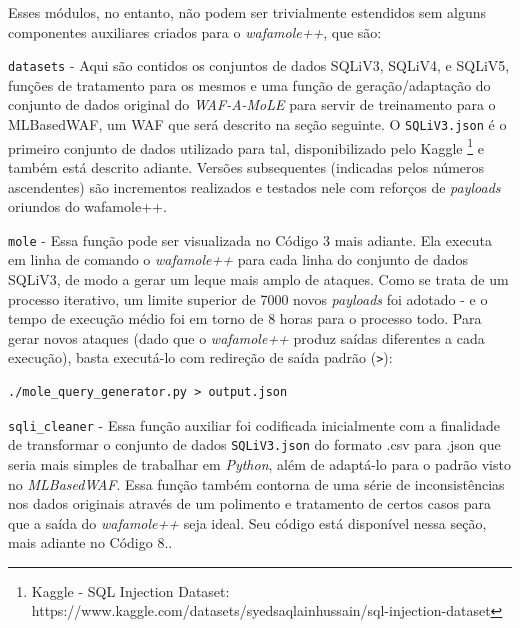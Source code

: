 Esses módulos, no entanto, não podem ser trivialmente estendidos sem alguns componentes auxiliares criados para o \textit{wafamole++}, que são:
\begin{alineas}
\item \verb+datasets+ - Aqui são contidos os conjuntos de dados SQLiV3, SQLiV4, e SQLiV5, funções de tratamento para os mesmos e uma função de geração/adaptação do conjunto de dados original do \textit{WAF-A-MoLE} para servir de treinamento para o MLBasedWAF, um WAF que será descrito na seção seguinte. O \verb+SQLiV3.json+ é o primeiro conjunto de dados utilizado para tal, disponibilizado pelo Kaggle \footnote{Kaggle - SQL Injection Dataset: https://www.kaggle.com/datasets/syedsaqlainhussain/sql-injection-dataset} \cite{kaggle_dataset_sql} e também está descrito adiante. Versões subsequentes (indicadas pelos números ascendentes) são incrementos realizados e testados nele com reforços de \textit{payloads} oriundos do wafamole++.

\begin{alineas}
\item \verb+mole+ - Essa função pode ser visualizada no Código 3 mais adiante. Ela executa em linha de comando o \textit{wafamole++} para cada linha do conjunto de dados SQLiV3, de modo a gerar um leque mais amplo de ataques. Como se trata de um processo iterativo, um limite superior de 7000 novos \textit{payloads} foi adotado - e o tempo de execução médio foi em torno de 8 horas para o processo todo. Para gerar novos ataques (dado que o \textit{wafamole++} produz saídas diferentes a cada execução), basta executá-lo com redireção de saída padrão (\verb+>+):
\begin{verbatim}
./mole_query_generator.py > output.json
\end{verbatim}


\item \verb+sqli_cleaner+ - Essa função auxiliar foi codificada inicialmente com a finalidade de transformar o conjunto de dados \verb+SQLiV3.json+ do formato .csv para .json que seria mais simples de trabalhar em \textit{Python}, além de adaptá-lo para o padrão visto no \textit{MLBasedWAF}. Essa função também contorna de uma série de inconsistências nos dados originais através de um polimento e tratamento de certos casos para que a saída do \textit{wafamole++} seja ideal. Seu código está disponível nessa seção, mais adiante no Código 8..


\end{alineas}
\end{alineas}
